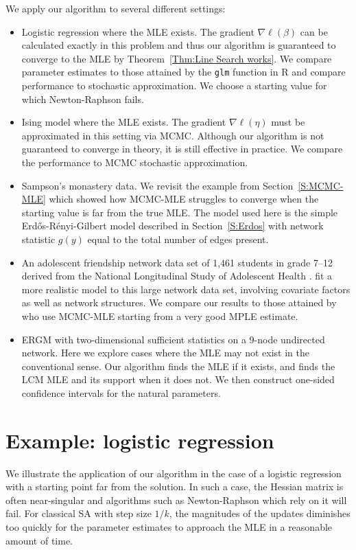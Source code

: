We apply our algorithm to several different settings:
\begin{itemize}
\item Logistic regression where the MLE exists.  The gradient $\nabla \ell(\beta)$ can be calculated exactly in this problem and thus our algorithm is guaranteed to converge to
the MLE by Theorem~\ref{Thm:Line Search works}.  We compare parameter estimates to those attained by the \texttt{glm} function in R and compare performance to stochastic approximation.  We choose a starting value for which Newton-Raphson fails.

\item Ising model where the MLE exists.  The gradient $\nabla \ell(\eta)$ must be approximated in this setting via MCMC.  Although our algorithm is not guaranteed to converge in theory, it is still effective in practice.  
We compare the performance to MCMC stochastic approximation.

\item Sampson's monastery data.  We revisit the example from Section~\ref{S:MCMC-MLE} which
showed how MCMC-MLE struggles to converge when the starting value is far
from the true MLE.  The model used here is the simple Erd\H{o}s-R\'{e}nyi-Gilbert model 
described in Section~\ref{S:Erdos} with network statistic $g(y)$ equal to the total number of edges present.

\item An adolescent friendship network data set of 1,461 students in grade 7--12 derived 
from the National Longitudinal Study of Adolescent Health \citep*{Resnick:1997}.  \citet{statnet-tutorial}
fit a more realistic model to this large network data set, involving covariate
factors as well as network structures.  We compare our results to those attained by
\citeauthor{statnet-tutorial} who use MCMC-MLE starting from a very good MPLE estimate.

\item ERGM with two-dimensional sufficient statistics on a 9-node undirected network.  
Here we explore cases where the MLE may not exist in the conventional sense.  
Our algorithm finds the MLE if it exists, and finds the LCM MLE and its support when 
it does not.  We then construct one-sided confidence intervals for the natural parameters.
\end{itemize}

\section{Example: logistic regression} \label{S:Example:logistic}
We illustrate the application of our algorithm in the case of a logistic regression 
with a starting point far from the 
solution.  In such a case, the Hessian matrix is often near-singular and algorithms 
such as Newton-Raphson which rely 
on it will fail.  For classical SA with step size $1/k$, the magnitudes of the updates 
diminishes too quickly for 
the parameter estimates to approach the MLE in a reasonable amount of time.

